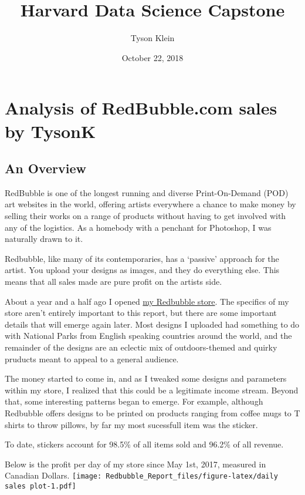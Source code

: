 \documentclass[]{article}
\title{Harvard Data Science Capstone}
\author{Tyson Klein}
\date{October 22, 2018}
\begin{document}
\maketitle

\section{Analysis of RedBubble.com sales by
TysonK}\label{analysis-of-redbubble.com-sales-by-tysonk}

\subsection{An Overview}\label{an-overview}

RedBubble is one of the longest running and diverse Print-On-Demand
(POD) art websites in the world, offering artists everywhere a chance to
make money by selling their works on a range of products without having
to get involved with any of the logistics. As a homebody with a penchant
for Photoshop, I was naturally drawn to it.

Redbubble, like many of its contemporaries, has a `passive' approach for
the artist. You upload your designs as images, and they do everything
else. This means that all sales made are pure profit on the artists
side.

About a year and a half ago I opened
\href{https://www.redbubble.com/people/tysonk?ref=account-nav-dropdown\&asc=u}{my
Redbubble store}. The specifics of my store aren't entirely important to
this report, but there are some important details that will emerge again
later. Most designs I uploaded had something to do with National Parks
from English speaking countries around the world, and the remainder of
the designs are an eclectic mix of outdoors-themed and quirky pruducts
meant to appeal to a general audience.

The money started to come in, and as I tweaked some designs and
parameters within my store, I realized that this could be a legitimate
income stream. Beyond that, some interesting patterns began to emerge.
For example, although Redbubble offers designs to be printed on products
ranging from coffee mugs to T shirts to throw pillows, by far my most
sucessfull item was the sticker.

To date, stickers account for 98.5\% of all items sold and 96.2\% of all
revenue.

Below is the profit per day of my store since May 1st, 2017, measured in
Canadian Dollars.
\texttt{[image: Redbubble\_Report\_files/figure-latex/daily sales plot-1.pdf]}
\end{document}
